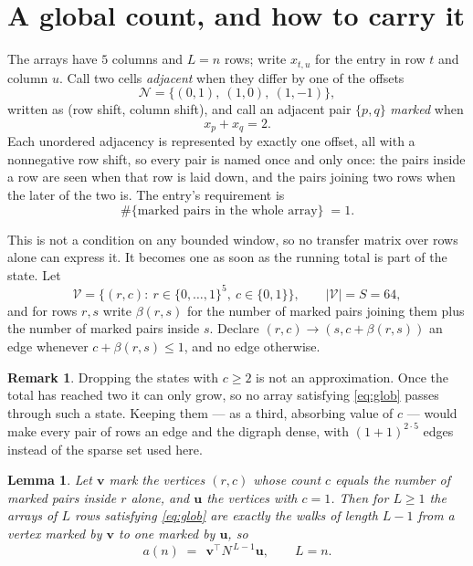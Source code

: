 \documentclass[11pt,a4paper]{article}
\theoremstyle{plain}
\newtheorem{lemma}[theorem]{Lemma}
\theoremstyle{definition}
\newtheorem{remark}[theorem]{Remark}
\begin{document}
\section{A global count, and how to carry it}

The arrays have $5$ columns and $L=n$ rows; write $x_{t,u}$ for the entry in
row $t$ and column $u$. Call two cells \emph{adjacent} when they differ by one of the
offsets
\[
\mathcal N=\{(0,1),\ (1,0),\ (1,-1)\},
\]
written as (row shift, column shift), and call an adjacent pair $\{p,q\}$
\emph{marked} when
\[
x_{p}+x_{q}=2 .
\]
Each unordered adjacency is represented by exactly one offset, all with a nonnegative row
shift, so every pair is named once and only once: the pairs inside a row are seen when
that row is laid down, and the pairs joining two rows when the later of the two is. The
entry's requirement is
\begin{equation}\label{eq:glob}
\#\{\text{marked pairs in the whole array}\}\;=1.
\end{equation}

This is not a condition on any bounded window, so no transfer matrix over rows alone can
express it. It becomes one as soon as the running total is part of the state. Let
\[
\mathcal V=\bigl\{(r,c):\ r\in\{0,\dots,1\}^{5},\ c\in\{0,1\}\bigr\},
\qquad |\mathcal V|=S=64,
\]
and for rows $r,s$ write $\beta(r,s)$ for the number of marked pairs joining them plus the
number of marked pairs inside $s$. Declare $(r,c)\to(s,c+\beta(r,s))$ an edge whenever
$c+\beta(r,s)\le1$, and no edge otherwise.

\begin{remark}
Dropping the states with $c\ge2$ is not an approximation. Once the total has reached two it
can only grow, so no array satisfying \eqref{eq:glob} passes through such a state. Keeping
them --- as a third, absorbing value of $c$ --- would make every pair of rows an edge and
the digraph dense, with $(1+1)^{2\cdot5}$ edges instead of the sparse set used here.
\end{remark}

\begin{lemma}\label{lem:walk}
Let $\mathbf{v}$ mark the vertices $(r,c)$ whose count $c$ equals the number of marked pairs
inside $r$ alone, and $\mathbf{u}$ the vertices with $c=1$. Then for $L\ge1$ the arrays
of $L$ rows satisfying \eqref{eq:glob} are exactly the walks of length $L-1$ from a
vertex marked by $\mathbf{v}$ to one marked by $\mathbf{u}$, so
\[
a(n)\;=\;\,\mathbf{v}^{\!\top}N^{\,L-1}\mathbf{u},\qquad L=n .
\]
\end{lemma}
\end{document}
